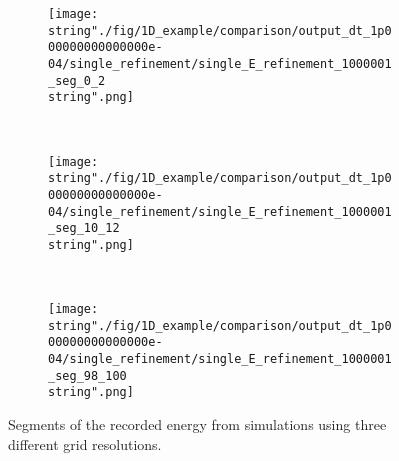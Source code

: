 \begin{minipage}[t]{.5\textwidth}
%
\begin{figure}[H]
\captionsetup{width=0.95\textwidth,font=footnotesize,labelfont=footnotesize}
\centering
%
\begin{subfigure}[b]{1\textwidth}
%
\centering\texttt{[image: \\string"./fig/1D\_example/comparison/output\_dt\_1p000000000000000e-04/single\_refinement/single\_E\_refinement\_1000001\_seg\_0\_2\\string".png]}
%
\end{subfigure}\hfill
\\[2ex]
%
\begin{subfigure}[b]{1\textwidth}
%
\centering\texttt{[image: \\string"./fig/1D\_example/comparison/output\_dt\_1p000000000000000e-04/single\_refinement/single\_E\_refinement\_1000001\_seg\_10\_12\\string".png]}
%
\end{subfigure}\hfill
\\[2ex]
%
\begin{subfigure}[b]{1\textwidth}
%
\centering\texttt{[image: \\string"./fig/1D\_example/comparison/output\_dt\_1p000000000000000e-04/single\_refinement/single\_E\_refinement\_1000001\_seg\_98\_100\\string".png]}
%
\end{subfigure}\hfill
%
\caption{Segments of the recorded energy from simulations using three different grid resolutions.
}
\label{single_Refinement_E_segments}
\end{figure}
%
\end{minipage}
